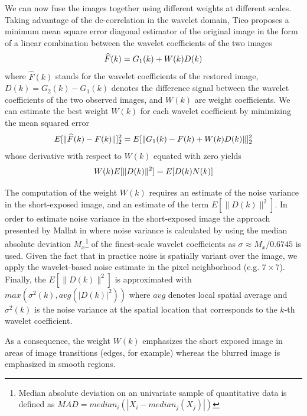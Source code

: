 \documentclass[12pt,notitlepage]{report}
\begin{document}
We can now fuse the images together using different weights at different scales.  Taking advantage of the de-correlation in the wavelet domain, Tico proposes a minimum mean square error diagonal estimator of the original image in the form of a linear combination between the wavelet coefficients of the two images
\begin{equation}
\label{eq:tico09_estimator}
	\widehat{F}(k) = G_1(k) + W(k)D(k) \\
\end{equation}
where $\widehat{F}(k)$ stands for the wavelet coefficients of the restored image, $D(k) = G_2(k) - G_1(k)$ denotes the difference signal between the wavelet coefficients of the two observed images, and $W(k)$ are weight coefficients.  We can estimate the best weight $W(k)$ for each wavelet coefficient by minimizing the mean squared error
\begin{equation}
\label{eq:tico09_weight}
	E[\|\widehat{F}(k)- F(k)\|]_2^2 = E[\|G_1(k) - F(k) + W(k)D(k)\|]_2^2 \\
\end{equation}
whose derivative with respect to $W(k)$ equated with zero yields
\begin{equation}
\label{eq:tico09_weight_derivative}
	W(k)E[\|D(k)\|^2] = E[D(k)N(k)] \\
\end{equation}

The computation of the weight $W(k)$ requires an estimate of the noise variance in the short-exposed image, and an estimate of the term $E[\|D(k)\|^2]$.  In order to estimate noise variance in the short-exposed image the approach presented by Mallat in \cite{mall09} where noise variance is calculated by using the median absolute deviation $M_x$\footnote[5]{Median absolute deviation on an univariate sample of quantitative data is defined as $MAD = median_i( | X_i - median_j(X_j)|) $} of the finest-scale wavelet coefficients  as $\sigma \approx M_x/0.6745$ is used. Given the fact that in practice noise is spatially variant over the image, we apply the wavelet-based noise estimate in the pixel neighborhood (e.g. $7 \times 7$). Finally, the $E[\|D(k)\|^2]$ is approximated with $max(\sigma^2(k),avg(|D(k)|^2))$ where $avg$ denotes local spatial average and $\sigma^2(k)$ is the noise variance at the spatial location that corresponds to the $k$-th wavelet coefficient.

As a consequence, the weight $W(k)$ emphasizes the short exposed image in areas of image transitions (edges, for example) whereas the blurred image is emphasized in smooth regions. 
\end{document}
